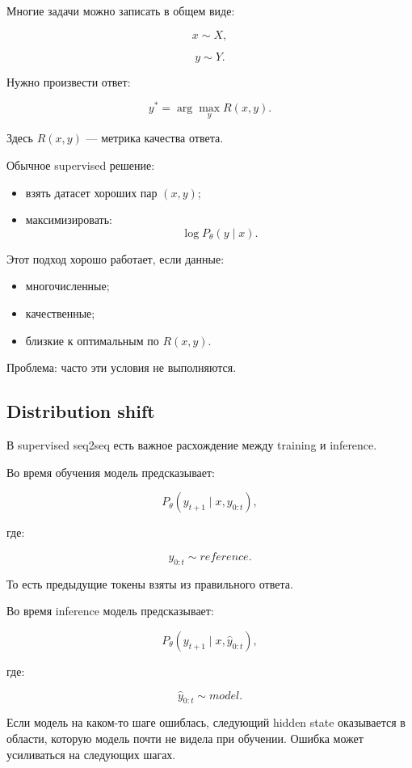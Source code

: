 \documentclass[a4paper,12pt]{article}
\begin{document}
Многие задачи можно записать в общем виде:

\[
x \sim X,
\]

\[
y \sim Y.
\]

Нужно произвести ответ:

\[
y^*
=
\arg\max_y R(x,y).
\]

Здесь \(R(x,y)\) --- метрика качества ответа.

Обычное supervised решение:

\begin{itemize}
    \item взять датасет хороших пар \((x,y)\);
    \item максимизировать:
    \[
    \log P_\theta(y\mid x).
    \]
\end{itemize}

Этот подход хорошо работает, если данные:

\begin{itemize}
    \item многочисленные;
    \item качественные;
    \item близкие к оптимальным по \(R(x,y)\).
\end{itemize}

Проблема: часто эти условия не выполняются.

\subsection{Distribution shift}

В supervised seq2seq есть важное расхождение между training и inference.

Во время обучения модель предсказывает:

\[
P_\theta(y_{t+1} \mid x, y_{0:t}),
\]

где:

\[
y_{0:t} \sim reference.
\]

То есть предыдущие токены взяты из правильного ответа.

Во время inference модель предсказывает:

\[
P_\theta(y_{t+1} \mid x, \hat{y}_{0:t}),
\]

где:

\[
\hat{y}_{0:t} \sim model.
\]

Если модель на каком-то шаге ошиблась, следующий hidden state оказывается в области, которую модель почти не видела при обучении. Ошибка может усиливаться на следующих шагах.
\end{document}
